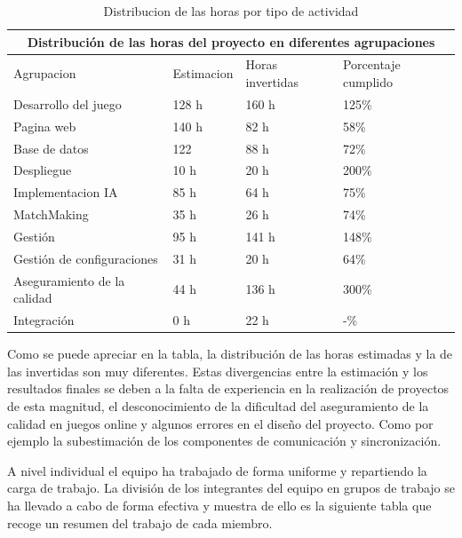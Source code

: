 \begin{table}[htb]
\centering
\begin{tabular}{|l|l|l|l|}
\hline
\multicolumn{4}{|c|}{Distribución de las horas del proyecto en diferentes agrupaciones} \\ \hline
	Agrupacion & Estimacion & Horas invertidas & Porcentaje cumplido\\ \hline
	Desarrollo del juego & 128 h & 160 h & 125\%\\ \hline
	Pagina web & 140 h & 82 h & 58\% \\ \hline
	Base de datos & 122 & 88 h & 72\%\\ \hline
	Despliegue & 10 h & 20 h & 200\%\\ \hline
	Implementacion IA & 85 h & 64 h & 75\% \\ \hline
	MatchMaking & 35 h & 26 h & 74\% \\ \hline
	Gestión & 95 h & 141 h & 148\% \\ \hline
	Gestión de configuraciones & 31 h & 20 h & 64\% \\ \hline
	Aseguramiento de la calidad & 44 h & 136 h & 300\% \\ \hline
	Integración & 0 h & 22 h & -\% \\ \hline
 \end{tabular}
 \caption{Distribucion de las horas por tipo de actividad}
\label{}
\end{table}

Como se puede apreciar en la tabla, la distribución de las horas estimadas y la de las invertidas son muy diferentes. Estas divergencias entre la estimación y los resultados finales se deben a la falta de experiencia en la realización de proyectos de esta magnitud, el desconocimiento de la dificultad del aseguramiento de la calidad en juegos online y algunos errores en el diseño del proyecto. Como por ejemplo la subestimación de los componentes de comunicación y sincronización.

A nivel individual el equipo ha trabajado de forma uniforme y repartiendo la carga de trabajo. La división de los integrantes del equipo en grupos de trabajo se ha llevado a cabo de forma efectiva y muestra de ello es la siguiente tabla que recoge un resumen del trabajo de cada miembro.

